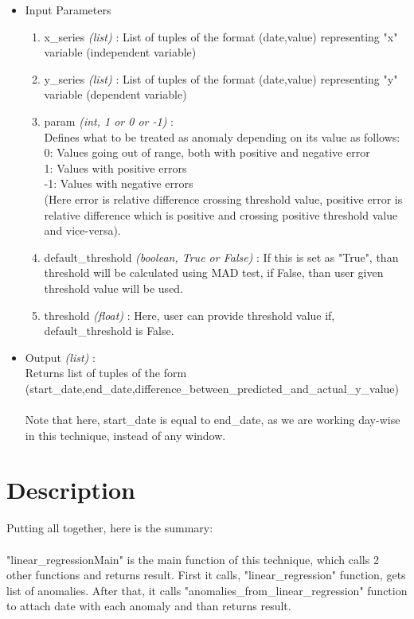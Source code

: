 \begin{itemize}
 \item Input Parameters
 
 \begin{enumerate}
  \item x\_series \textit{(list)} : List of tuples of the format (date,value) 
representing "x" variable (independent variable)
  \item y\_series \textit{(list)} : List of tuples of the format (date,value) 
representing "y" variable (dependent variable)
  \item param \textit{(int, 1 or 0 or -1)} : \\
  		Defines what to be treated as anomaly depending on its value as 
follows:\\
        0: Values going out of range, both with positive and negative error\\
        1: Values with positive errors\\
        -1: Values with negative errors\\
        (Here error is relative difference crossing threshold value, 
positive error is relative difference which is positive and crossing positive 
threshold value and vice-versa).
  \item default\_threshold \textit{(boolean, True or False)} : If this is set as 
"True", than threshold will be calculated using MAD test, if False, than user 
given threshold value will be used.
  \item threshold \textit{(float)} : Here, user can provide threshold value if, 
default\_threshold is False.

 \end{enumerate}

 \item Output \textit{(list)} : \\
 	Returns list of tuples of the form \\
 	
(start\_date,end\_date,difference\_between\_predicted\_and\_actual\_y\_value) \\
 	\\
 	Note that here, start\_date is equal to end\_date, as we are working 
day-wise in this technique, instead of any window.
 
\end{itemize}

\section{Description}

Putting all together, here is the summary:\\
\\
"linear\_regressionMain" is the main function of this technique, which calls 2 
other functions and returns result. First it calls, "linear\_regression" 
function, gets list of anomalies. After that, it calls 
"anomalies\_from\_linear\_regression" function to attach date with each anomaly 
and than returns result.